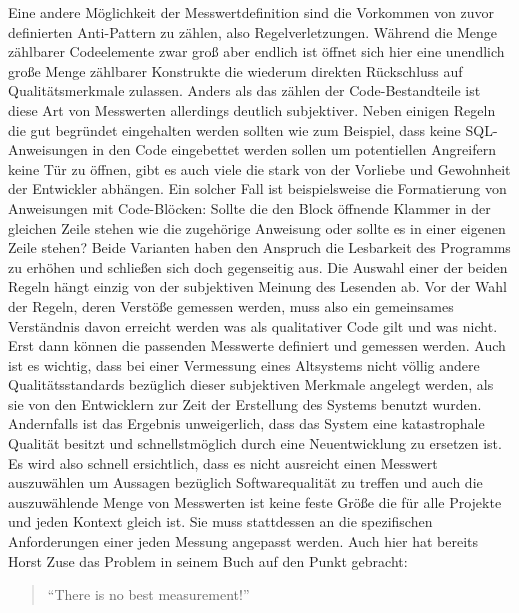 \documentclass[gb,ngerman]{stthesis}
\begin{document}
       Eine andere Möglichkeit der Messwertdefinition sind die Vorkommen von zuvor definierten Anti-Pattern zu zählen, also Regelverletzungen. Während die Menge zählbarer Codeelemente zwar groß aber endlich ist öffnet sich hier eine unendlich große Menge zählbarer Konstrukte die wiederum direkten Rückschluss auf Qualitätsmerkmale zulassen. Anders als das zählen der Code-Bestandteile ist diese Art von Messwerten allerdings deutlich subjektiver. Neben einigen Regeln die gut begründet eingehalten werden sollten wie zum Beispiel, dass keine SQL-Anweisungen in den Code eingebettet werden sollen um potentiellen Angreifern keine Tür zu öffnen, gibt es auch viele die stark von der Vorliebe und Gewohnheit der Entwickler abhängen. Ein solcher Fall ist beispielsweise die Formatierung von Anweisungen mit Code-Blöcken: Sollte die den Block öffnende Klammer in der gleichen Zeile stehen wie die zugehörige Anweisung oder sollte es in einer eigenen Zeile stehen? Beide Varianten haben den Anspruch die Lesbarkeit des Programms zu erhöhen und schließen sich doch gegenseitig aus. Die Auswahl einer der beiden Regeln hängt einzig von der subjektiven Meinung des Lesenden ab. Vor der Wahl der Regeln, deren Verstöße gemessen werden, muss also ein gemeinsames Verständnis davon erreicht werden was als qualitativer Code gilt und was nicht. Erst dann können die passenden Messwerte definiert und gemessen werden. Auch ist es wichtig, dass bei einer Vermessung eines Altsystems nicht völlig andere Qualitätsstandards bezüglich dieser subjektiven Merkmale angelegt werden, als sie von den Entwicklern zur Zeit der Erstellung des Systems benutzt wurden. Andernfalls ist das Ergebnis unweigerlich, dass das System eine katastrophale Qualität besitzt und schnellstmöglich durch eine Neuentwicklung zu ersetzen ist. \newline
       Es wird also schnell ersichtlich, dass es nicht ausreicht einen Messwert auszuwählen um Aussagen bezüglich Softwarequalität zu treffen und auch die auszuwählende Menge von Messwerten ist keine feste Größe die für alle Projekte und jeden Kontext gleich ist. Sie muss stattdessen an die spezifischen Anforderungen einer jeden Messung angepasst werden. Auch hier hat bereits Horst Zuse das Problem in seinem Buch \cite{FrameworkSoftwareMeasurement} auf den Punkt gebracht:
  		\begin{quote}
  			"`There is no best measurement!"'
  		\end{quote}  
\end{document}
